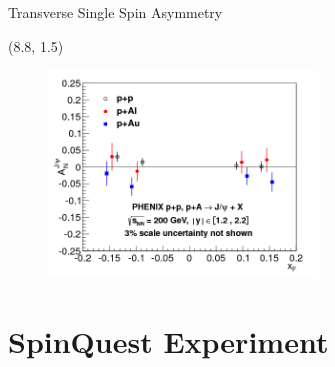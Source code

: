 \documentclass[10pt, xcolor={dvipsnames}, aspectratio = 169]{beamer}
\newcommand{\citeme}[1]{{\tiny \footfullcite{#1}}}
\begin{document}
\begin{frame}{Transverse Single Spin Asymmetry}

\begin{textblock}{7.0}(8.8, 1.5)

\begin{figure}
    \centering
    \includegraphics[height = 5.5cm]{imgs/final_xf.png}
\end{figure}

\end{textblock}

\end{frame}

%
%

\section{SpinQuest Experiment}
\end{document}
